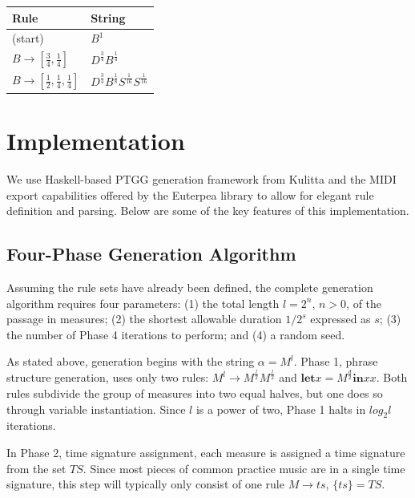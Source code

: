 \documentclass{article}
\begin{document}
\bgroup
\def\arraystretch{1.5}
\begin{center}
\begin{tabular}{ l l }
 Rule & String \\
 \hline
 (start)                                                  & $B^{1}$ \\
 $B \rightarrow [\frac{3}{4}, \frac{1}{4}]$               & $D^{\frac{3}{4}} B^{\frac{1}{4}}$ \\
 $B \rightarrow [\frac{1}{2}, \frac{1}{4}, \frac{1}{4}]$  & $D^{\frac{3}{4}} B^{\frac{1}{8}} S^{\frac{1}{16}} S^{\frac{1}{16}}$ \\
\end{tabular}
\end{center}
\egroup


\section{Implementation}

We use Haskell-based PTGG generation framework from Kulitta and the MIDI export capabilities offered by the Euterpea library \cite{euterpea} to allow for elegant rule definition and parsing. Below are some of the key features of this implementation.

\subsection{Four-Phase Generation Algorithm}

Assuming the rule sets have already been defined, the complete generation algorithm requires four parameters: (1) the total length $l = 2^n$, $n > 0$, of the passage in measures; (2) the shortest allowable duration $1/{2^s}$ expressed as $s$; (3) the number of Phase 4 iterations to perform; and (4) a random seed.

As stated above, generation begins with the string $\alpha = M^l$. Phase 1, phrase structure generation, uses only two rules: $M^l \rightarrow M^\frac{l}{2} M^\frac{l}{2}$ and $\textbf{let} x = M^\frac{d}{2} \textbf{in} x x$. Both rules subdivide the group of measures into two equal halves, but one does so through variable instantiation. Since $l$ is a power of two, Phase 1 halts in $log_2 l$ iterations.

In Phase 2, time signature assignment, each measure is assigned a time signature from the set $TS$. Since most pieces of common practice music are in a single time signature, this step will typically only consist of one rule \linebreak $M \rightarrow ts$, $\{ ts \} = TS$.
\end{document}
